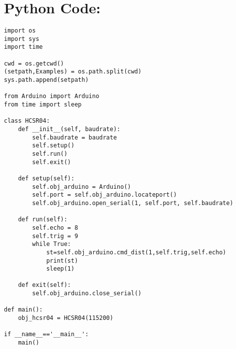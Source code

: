 \section{Python Code:}
\lstset{language=Python}
\lstset{frame=lines}
\lstset{basicstyle=\footnotesize}
\begin{lstlisting}
import os 
import sys
import time

cwd = os.getcwd()
(setpath,Examples) = os.path.split(cwd)
sys.path.append(setpath)

from Arduino import Arduino
from time import sleep

class HCSR04:
    def __init__(self, baudrate):
        self.baudrate = baudrate
        self.setup()
        self.run()
        self.exit()

    def setup(self):
        self.obj_arduino = Arduino()
        self.port = self.obj_arduino.locateport()
        self.obj_arduino.open_serial(1, self.port, self.baudrate)

    def run(self):
        self.echo = 8
        self.trig = 9
        while True:
            st=self.obj_arduino.cmd_dist(1,self.trig,self.echo)
            print(st)
            sleep(1)
            
    def exit(self):
        self.obj_arduino.close_serial()

def main():
    obj_hcsr04 = HCSR04(115200)

if __name__=='__main__':
    main()

\end{lstlisting}


